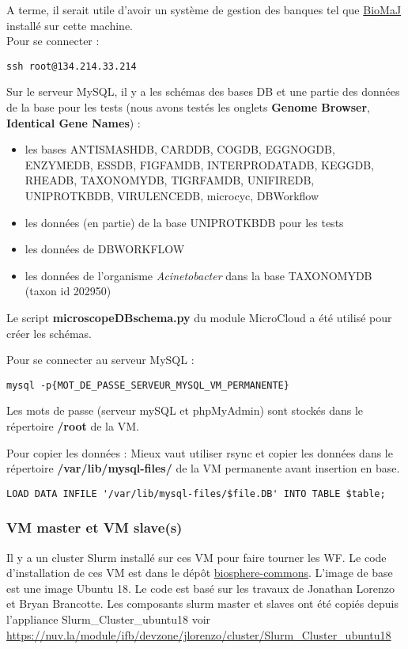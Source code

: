A terme, il serait utile d'avoir un système de gestion des banques tel que \href{https://biomaj.genouest.org/}{BioMaJ} installé sur cette machine.\\

Pour se connecter : 
\begin{lstlisting}[style=bash]
ssh root@134.214.33.214
\end{lstlisting}
\bigskip

Sur le serveur MySQL, il y a les schémas des bases DB et une partie des données de la base pour les tests (nous avons testés les onglets \textbf{Genome Browser}, \textbf{Identical Gene Names}) :
\begin{itemize}
	\item les bases ANTISMASHDB, CARDDB, COGDB, EGGNOGDB, ENZYMEDB, ESSDB, FIGFAMDB, INTERPRODATADB, KEGGDB, RHEADB, TAXONOMYDB, TIGRFAMDB, UNIFIREDB, UNIPROTKBDB, VIRULENCEDB, microcyc, DBWorkflow
	\item les données (en partie) de la base UNIPROTKBDB pour les tests
	\item les données de DBWORKFLOW
	\item les données de l'organisme \textit{Acinetobacter} dans la base TAXONOMYDB (taxon id 202950)
\end{itemize}

Le script \textbf{microscopeDBschema.py} du module MicroCloud a été utilisé pour créer les schémas.
\newline

Pour se connecter au serveur MySQL :
\begin{lstlisting}[style=bash]
mysql -p{MOT_DE_PASSE_SERVEUR_MYSQL_VM_PERMANENTE}
\end{lstlisting}
\bigskip

Les mots de passe (serveur mySQL et phpMyAdmin) sont stockés dans le répertoire \textbf{/root} de la VM.
\newline 

Pour copier les données :
Mieux vaut utiliser rsync et copier les données dans le répertoire \textbf{/var/lib/mysql-files/} de la VM permanente avant insertion en base.\\

\begin{lstlisting}[style=bash]
LOAD DATA INFILE '/var/lib/mysql-files/$file.DB' INTO TABLE $table;
\end{lstlisting}

\subsubsection{VM master et VM slave(s)}
\label{master&slave} Il y a un cluster Slurm installé sur ces VM pour faire tourner les WF. Le code d’installation de ces VM est dans le dépôt \href{https://github.com/IFB-ElixirFr/biosphere-commons}{biosphere-commons}.
L'image de base est une image Ubuntu 18.
Le code est basé sur les travaux de Jonathan Lorenzo et Bryan Brancotte.
Les composants slurm master et slaves ont été copiés depuis l'appliance Slurm\_Cluster\_ubuntu18 voir \url{https://nuv.la/module/ifb/devzone/jlorenzo/cluster/Slurm_Cluster_ubuntu18}

